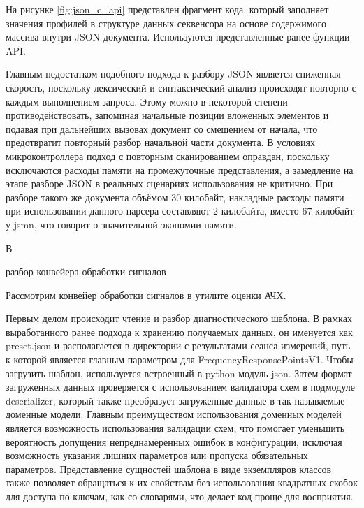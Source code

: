 \documentclass{report}
\begin{document}
На рисунке \ref{fig:json_c_api} представлен фрагмент кода, который заполняет значения профилей в структуре данных секвенсора на основе содержимого массива внутри JSON-документа. Используются представленные ранее функции API.


Главным недостатком подобного подхода к разбору JSON является сниженная скорость, поскольку лексический и синтаксический анализ происходят повторно с каждым выполнением запроса. Этому можно в некоторой степени противодействовать, запоминая начальные позиции вложенных элементов и подавая при дальнейших вызовах документ со смещением от начала, что предотвратит повторный разбор начальной части документа. В условиях микроконтроллера подход с повторным сканированием оправдан, поскольку исключаются расходы памяти на промежуточные представления, а замедление на этапе разборе JSON в реальных сценариях использования не критично. При разборе такого же документа объёмом 30 килобайт, накладные расходы памяти при использовании данного парсера составляют 2 килобайта, вместо 67 килобайт у jsmn, что говорит о значительной экономии памяти.

\pagebreak
\begin{flushright}
     В
\end{flushright}

\begin{center}   разбор конвейера обработки сигналов \end{center}

Рассмотрим конвейер обработки сигналов в утилите оценки АЧХ.

Первым делом происходит чтение и разбор диагностического шаблона. В рамках выработанного ранее подхода к хранению получаемых данных, он именуется как preset.json и располагается в директории с результатами сеанса измерений, путь к которой является главным параметром для FrequencyResponsePointsV1. Чтобы загрузить шаблон, используется встроенный в python модуль json. Затем формат загруженных данных проверяется с использованием валидатора схем в подмодуле deserializer, который также преобразует загруженные данные в так называемые доменные модели. Главным преимуществом использования доменных моделей является возможность использования валидации схем, что помогает уменьшить вероятность допущения непреднамеренных ошибок в конфигурации, исключая возможность указания лишних параметров или пропуска обязательных параметров. Представление сущностей шаблона в виде экземпляров классов также позволяет обращаться к их свойствам без использования квадратных скобок для доступа по ключам, как со словарями, что делает код проще для восприятия.
\end{document}
